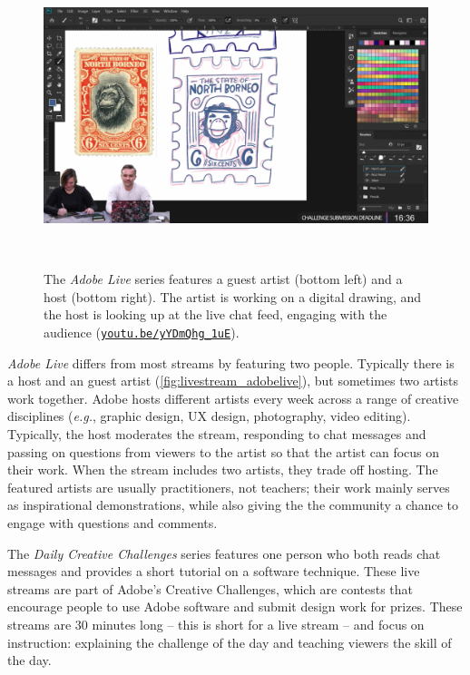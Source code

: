 \begin{figure}[b!]
\centering
  \includegraphics[width=0.6\columnwidth]{liveclips/figures/adobelive.png}
  \caption{The \textit{Adobe Live} series features a guest artist (bottom left) and a host (bottom right). The artist is working on a digital drawing, and the host is looking up at the live chat feed, engaging with the audience (\href{https://youtu.be/yYDmQhg_1uE}{\nolinkurl{youtu.be/yYDmQhg_1uE}}). }~\label{fig:livestream_adobelive}
\end{figure}

\textit{Adobe Live} differs from most streams by featuring two people. Typically there is a host and an guest artist (\autoref{fig:livestream_adobelive}), but sometimes two artists work together. Adobe hosts different artists every week across a range of creative disciplines (\textit{e.g.}, graphic design, UX design, photography, video editing). Typically, the host moderates the stream, responding to chat messages and passing on questions from viewers to the artist so that the artist can focus on their work. When the stream includes two artists, they trade off hosting.
The featured artists are usually practitioners, not teachers; their work mainly serves as inspirational demonstrations, while also giving the the community a chance to engage with questions and comments. 

The \textit{Daily Creative Challenges} series features one person who both reads chat messages and provides a short tutorial on a software technique. These live streams are part of Adobe's Creative Challenges, which are contests that encourage people to use Adobe software and submit design work for prizes\footnotemark. These streams are 30 minutes long -- this is short for a live stream -- and focus on instruction: explaining the challenge of the day and teaching viewers the skill of the day. 

